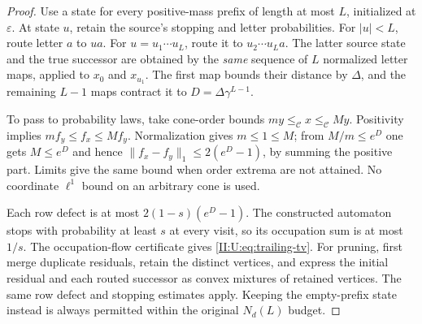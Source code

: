\begin{proof}
Use a state for every positive-mass prefix of length at most $L$, initialized at
$\varepsilon$. At state $u$, retain the source's stopping and letter
probabilities. For $|u|<L$, route letter $a$ to $ua$. For
$u=u_1\cdots u_L$, route it to $u_2\cdots u_La$. The latter source
state and the true successor are obtained by the \emph{same} sequence
of $L$ normalized letter maps, applied to $x_0$ and $x_{u_1}$.
The first map bounds their distance by $\Delta$, and the remaining
$L-1$ maps contract it to $D=\Delta\gamma^{L-1}$.

To pass to probability laws, take cone-order bounds
$m y\le_{\mathcal C}x\le_{\mathcal C}M y$. Positivity implies
$m f_y\le f_x\le M f_y$. Normalization gives $m\le1\le M$;
from $M/m\le e^D$ one gets $M\le e^D$ and hence
$\|f_x-f_y\|_1\le2(e^D-1)$, by summing the positive part.
Limits give the same bound when order extrema are not attained.
No coordinate $\ell^1$ bound on an arbitrary cone is used.

Each row defect is at most $2(1-s)(e^D-1)$. The constructed automaton
stops with probability at least $s$ at every visit, so its occupation
sum is at most $1/s$. The occupation-flow certificate gives
\eqref{II:U:eq:trailing-tv}. For pruning, first merge duplicate residuals,
retain the distinct vertices, and express the initial residual and each
routed successor as convex mixtures of retained vertices. The same row
defect and stopping estimates apply. Keeping the empty-prefix state
instead is always permitted within the original $N_d(L)$ budget.
\end{proof}
